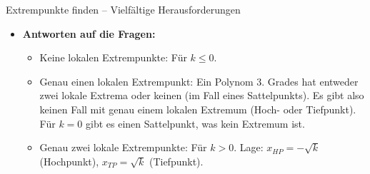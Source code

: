\begin{loesungsumgebung}{Extrempunkte finden – Vielfältige Herausforderungen}
\begin{enumerate}[label=(\alph*)]
\begin{itemize}
        \item \textbf{Antworten auf die Fragen:}
        \begin{itemize}
            \item Keine lokalen Extrempunkte: Für $k \le 0$.
            \item Genau einen lokalen Extrempunkt: Ein Polynom 3. Grades hat entweder zwei lokale Extrema oder keinen (im Fall eines Sattelpunkts). Es gibt also keinen Fall mit genau einem lokalen Extremum (Hoch- oder Tiefpunkt). Für $k=0$ gibt es einen Sattelpunkt, was kein Extremum ist.
            \item Genau zwei lokale Extrempunkte: Für $k > 0$.
            Lage: $x_{HP} = -\sqrt{k}$ (Hochpunkt), $x_{TP} = \sqrt{k}$ (Tiefpunkt).
        \end{itemize}
    \end{itemize}


\end{enumerate}
\end{loesungsumgebung}
